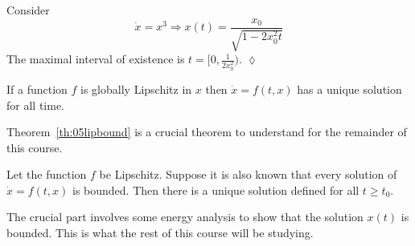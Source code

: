 \begin{example}
Consider
$$\dot{x} = x^3 \Rightarrow x(t) = \frac{x_0}{\sqrt{1-2x_0^2t}}$$
The maximal interval of existence is $t=[0,\frac{1}{2x_0^2})$.%
$\lozenge$
\end{example}

\begin{theorem}
If a function $f$ is globally Lipschitz in $x$ then $\dot{x}=f(t,x)$ has a unique solution for all time.
\end{theorem}

Theorem~\ref{th:05lipbound} is a crucial theorem to understand for the remainder of this course.
\begin{theorem}
\label{th:05lipbound}
Let the function $f$ be Lipschitz.
Suppose it is also known that every solution of $\dot{x}=f(t,x)$ is bounded.
Then there is a unique solution defined for all $t\geq t_0$.
\end{theorem}

The crucial part involves some energy analysis to show that the solution $x(t)$ is bounded.
This is what the rest of this course will be studying.%
